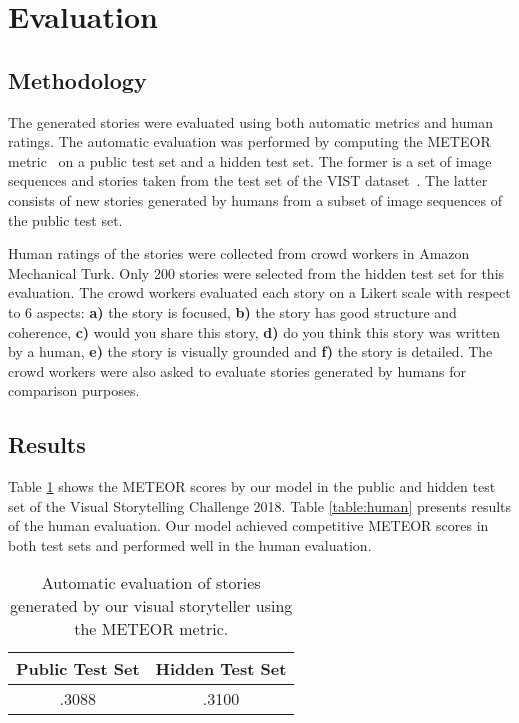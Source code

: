 \documentclass[11pt,a4paper]{article}
\begin{document}
\section{Evaluation}

\subsection{Methodology}
The generated stories were evaluated using both automatic metrics and human ratings.
The automatic evaluation was performed by computing the METEOR metric~\cite{banerjee} on a public test set and a hidden test set. 
The former is a set of  image sequences and stories taken from the test set of the VIST dataset~\cite{huang2016}. 
The latter consists of new stories generated by humans from a subset of image sequences of the public test set.
 
 Human ratings of the stories were collected from crowd workers in Amazon Mechanical Turk. 
 Only 200 stories were selected from the hidden test set for this evaluation. 
 The crowd workers evaluated each story on a Likert scale with respect to 6 aspects: \textbf{a)} the story is focused, \textbf{b)} the story has good structure and coherence, \textbf{c)} would you share this story, \textbf{d)} do you think this story was written by a human, \textbf{e)} the story is visually grounded and \textbf{f)} the story is detailed. 
 The crowd workers were also asked to evaluate stories generated by humans for comparison purposes.

\subsection{Results}
Table \ref{table:meteor} shows the METEOR scores by our model in the public and hidden test set of the Visual Storytelling Challenge 2018. 
 Table \ref{table:human} presents results of the human evaluation. Our model achieved competitive METEOR scores in both test sets and performed well in the human evaluation.
 
 \begin{table}[h!]
    \begin{center}
      \begin{tabular}{ | c | c | }
        \hline
         \bf Public Test Set & \bf Hidden Test Set \\ \hline
         .3088 & .3100 \\ \hline
      \end{tabular}
      \caption{Automatic evaluation of stories generated by our visual storyteller using the METEOR metric.}
      \label{table:meteor}
    \end{center}
\end{table}
\end{document}
